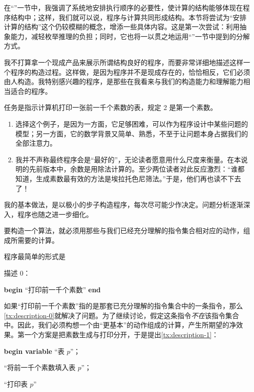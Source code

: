 在“”一节中，我强调了系统地安排执行顺序的必要性，使计算的结构能够体现在程序结构中；这样，我们就可以说，程序与计算共同形成结构。本节将尝试为“安排计算的结构”这个仍较模糊的概念，增添一些具体内容。这是第一次尝试：利用抽象能力，减轻枚举推理的负担；同时，它也将一以贯之地运用“”一节中提到的分解方式。

我不打算拿一个现成产品来展示所谓结构良好的程序，而要非常详细地描述这样一个程序的构造过程。这样做，是因为程序并不是现成存在的，恰恰相反，它们必须由人构造。我特别感兴趣的程序，是那些在我看来与我们的构造能力和理解能力相当适合的程序。

任务是指示计算机打印一张前一千个素数的表，规定 2 是第一个素数。

\begin{enumerate}[leftmargin=*, itemindent=2.2\parindent, label=\textit{注 }\arabic*.]
	\item 选择这个例子，是因为一方面，它足够困难，可以作为程序设计中某些问题的模型；另一方面，它的数学背景又简单、熟悉，不至于让问题本身占据我们的全部注意力。
	
	\item 我并不声称最终程序会是“最好的”，无论读者愿意用什么尺度来衡量。在本说明的先前版本中，余数是用除法计算的。至少两位读者对此反应激烈：“谁都知道，生成素数最有效的方法是埃拉托色尼筛法。”于是，他们再也读不下去了！
\end{enumerate}

我的基本做法，是以极小的步子构造程序，每次尽可能少作决定。问题分析逐渐深入，程序也随之进一步细化。

要构造一个算法，就必须用那些与我们已经充分理解的指令集合相对应的动作，组成所需要的计算。

程序最简单的形式是
\medskip


\noindent
描述 0：

\textbf{begin} “打印前一千个素数” \textbf{end}

\noindent
如果“打印前一千个素数”指的是那套已充分理解的指令集合中的一条指令，那么\ref{tx:description-0}就解决了问题。为了继续讨论，假定这条指令\textit{不在}该指令集合中。因此，我们必须构想一个由“更基本”的动作组成的计算，产生所期望的净效果。第一个方案是把素数生成与打印分开，于是提出\ref{tx:description-1}：
\medskip

\textbf{begin variable} “表 $p$”；

\quad “将前一千个素数填入表 $p$”；

\quad “打印表 $p$”

